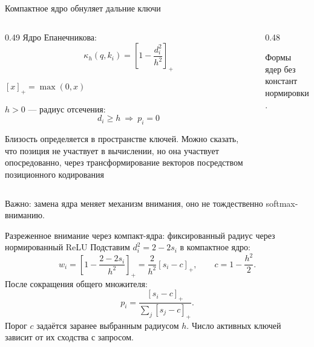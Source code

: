 \documentclass[aspectratio=169,12pt]{beamer}
\newcommand{\pos}[1]{\left[#1\right]_{+}}
\begin{document}
\begin{frame}{Компактное ядро обнуляет дальние ключи}
  \begin{columns}[T,onlytextwidth]
    \begin{column}{0.49\textwidth}
      Ядро Епанечникова:
      $$
        \kappa_h(q,k_i)=
        \pos{1-\frac{d_i^2}{h^2}}
      $$

      $[x]_+=\max(0,x)$

      \(h>0\) — радиус отсечения:
      $$
        d_i\geq h\ \Longrightarrow\ p_i=0
      $$

      Близость определяется в пространстве
      ключей. Можно сказать, что позиция не участвует в вычислении, 
      но она участвует опосредованно, через трансформирование векторов посредством 
      позиционного кодирования
    \end{column}
    \begin{column}{0.48\textwidth}
      \centering
      {\fontsize{8}{10}\selectfont\color{muted}
        Формы ядер без констант нормировки.\par}
    \end{column}
  \end{columns}
  Важно: замена ядра меняет механизм внимания, оно не тождественно softmax-вниманию.
\end{frame}

\begin{frame}{Разреженное внимание через компакт-ядра: фиксированный радиус через нормированный ReLU}
  Подставим $d_i^2=2-2s_i$ в компактное ядро:
  $$
    w_i=\pos{1-\frac{2-2s_i}{h^2}}
       =\frac{2}{h^2}\pos{s_i-c},
    \qquad c=1-\frac{h^2}{2}.
  $$
  После сокращения общего множителя:
  $$
    p_i=\frac{\pos{s_i-c}}{\sum_j\pos{s_j-c}}.
  $$
  Порог $c$ задаётся заранее выбранным радиусом $h$. 
  Число активных ключей зависит от их сходства с запросом.
\end{frame}
\end{document}
